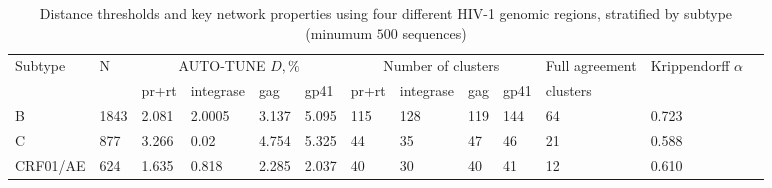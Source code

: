 \documentclass[utf8]{FrontiersinHarvard} %
\begin{document}
\begin{table}[h]
	\caption{Distance thresholds and key network properties using four different HIV-1 genomic regions, stratified by subtype (minumum $500$ sequences)}

	\vspace{10pt}
	\centering
	\begin{ssmall}
		\label{tab:LANL:full}
		\begin{tabular}{lllllllllllll}
			\hline
			Subtype & N     & \multicolumn{4}{c}{AUTO-TUNE $D, \%$} & \multicolumn{4}{c}{Number of clusters} & Full agreement & Krippendorff $\alpha$                                               \\
			        &       & pr+rt                                 & integrase                              & gag            & gp41                  & pr+rt & integrase & gag & gp41 & clusters & \\
			\hline

			B       & 1843  & 2.081                                 & 2.0005                                 & 3.137          & 5.095                 & 115   & 128       & 119 & 144  & 64       &
			0.723                                                                                                                                                                                   \\ C & 877 & 3.266 & 0.02 & 4.754 & 5.325 & 44 & 35 & 47 & 46 & 21 &
			0.588                                                                                                                                                                                   \\ CRF01/AE & 624                        & 1.635 & 0.818 & 2.285 & 2.037 & 40 & 30 & 40 & 41 & 12
			        & 0.610                                                                                                                                                                         \\

			\hline
		\end{tabular}
	\end{ssmall}
\end{table}

\end{document}
